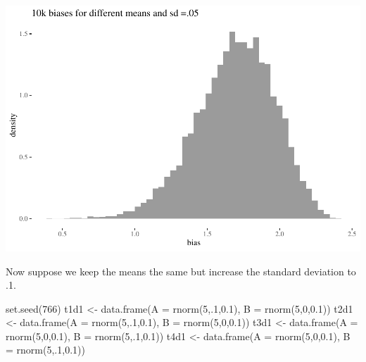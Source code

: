 \documentclass[
  10pt,
  dvipsnames,enabledeprecatedfontcommands]{scrartcl}
\newenvironment{Shaded}{\begin{snugshade}}{\end{snugshade}}
\newcommand{\AttributeTok}[1]{\textcolor[rgb]{0.77,0.63,0.00}{#1}}
\newcommand{\DecValTok}[1]{\textcolor[rgb]{0.00,0.00,0.81}{#1}}
\newcommand{\FloatTok}[1]{\textcolor[rgb]{0.00,0.00,0.81}{#1}}
\newcommand{\FunctionTok}[1]{\textcolor[rgb]{0.00,0.00,0.00}{#1}}
\newcommand{\NormalTok}[1]{#1}
\newcommand{\OtherTok}[1]{\textcolor[rgb]{0.56,0.35,0.01}{#1}}
\begin{document}
\begin{center}\includegraphics[width=1\linewidth]{paperDraft_files/figure-latex/unnamed-chunk-12-1} \end{center}
\normalsize

\noindent Now suppose we keep the means the same but increase the
standard deviation to .1.

\vspace{1mm}
\footnotesize

\begin{Shaded}
\begin{Highlighting}[]
\FunctionTok{set.seed}\NormalTok{(}\DecValTok{766}\NormalTok{)}
\NormalTok{t1d1 }\OtherTok{\textless{}{-}} \FunctionTok{data.frame}\NormalTok{(}\AttributeTok{A  =} \FunctionTok{rnorm}\NormalTok{(}\DecValTok{5}\NormalTok{,.}\DecValTok{1}\NormalTok{,}\FloatTok{0.1}\NormalTok{), }\AttributeTok{B =} \FunctionTok{rnorm}\NormalTok{(}\DecValTok{5}\NormalTok{,}\DecValTok{0}\NormalTok{,}\FloatTok{0.1}\NormalTok{))}
\NormalTok{t2d1 }\OtherTok{\textless{}{-}} \FunctionTok{data.frame}\NormalTok{(}\AttributeTok{A  =} \FunctionTok{rnorm}\NormalTok{(}\DecValTok{5}\NormalTok{,.}\DecValTok{1}\NormalTok{,}\FloatTok{0.1}\NormalTok{), }\AttributeTok{B =} \FunctionTok{rnorm}\NormalTok{(}\DecValTok{5}\NormalTok{,}\DecValTok{0}\NormalTok{,}\FloatTok{0.1}\NormalTok{))}
\NormalTok{t3d1 }\OtherTok{\textless{}{-}} \FunctionTok{data.frame}\NormalTok{(}\AttributeTok{A  =} \FunctionTok{rnorm}\NormalTok{(}\DecValTok{5}\NormalTok{,}\DecValTok{0}\NormalTok{,}\FloatTok{0.1}\NormalTok{), }\AttributeTok{B =} \FunctionTok{rnorm}\NormalTok{(}\DecValTok{5}\NormalTok{,.}\DecValTok{1}\NormalTok{,}\FloatTok{0.1}\NormalTok{))}
\NormalTok{t4d1 }\OtherTok{\textless{}{-}} \FunctionTok{data.frame}\NormalTok{(}\AttributeTok{A  =} \FunctionTok{rnorm}\NormalTok{(}\DecValTok{5}\NormalTok{,}\DecValTok{0}\NormalTok{,}\FloatTok{0.1}\NormalTok{), }\AttributeTok{B =} \FunctionTok{rnorm}\NormalTok{(}\DecValTok{5}\NormalTok{,.}\DecValTok{1}\NormalTok{,}\FloatTok{0.1}\NormalTok{))}
\end{Highlighting}
\end{Shaded}
\end{document}
